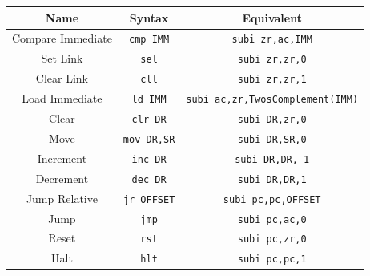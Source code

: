 \begin{center}
    \begin{tabular}{|c|c|c|}
        \hline
        Name & Syntax & Equivalent \\
        \hline
        Compare Immediate & \verb|cmp IMM| & \verb|subi zr,ac,IMM| \\
        \hline
        Set Link & \verb|sel| & \verb|subi zr,zr,0| \\
        \hline
        Clear Link & \verb|cll| & \verb|subi zr,zr,1| \\
        \hline
        Load Immediate & \verb|ld IMM| & \verb|subi ac,zr,TwosComplement(IMM)| \\
        \hline
        Clear & \verb|clr DR| & \verb|subi DR,zr,0| \\
        \hline
        Move & \verb|mov DR,SR| & \verb|subi DR,SR,0| \\
        \hline
        Increment & \verb|inc DR| & \verb|subi DR,DR,-1| \\
        \hline
        Decrement & \verb|dec DR| & \verb|subi DR,DR,1| \\
        \hline
        Jump Relative & \verb|jr OFFSET| & \verb|subi pc,pc,OFFSET| \\
        \hline
        Jump & \verb|jmp| & \verb|subi pc,ac,0| \\
        \hline
        Reset & \verb|rst| & \verb|subi pc,zr,0|\\
        \hline
        Halt & \verb|hlt| & \verb|subi pc,pc,1| \\
        \hline
    \end{tabular}
\end{center}
